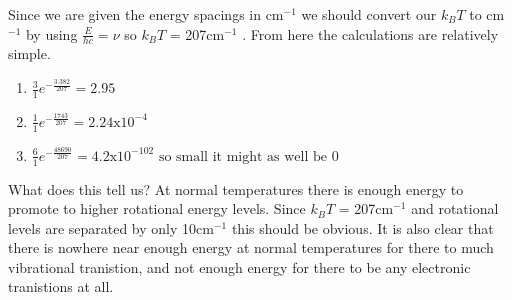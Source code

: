 \documentclass{article}
\newcommand{\cm}{cm\(^{-1}\) }
\begin{document}
    Since we are given the energy spacings in cm\(^{-1}\) we should convert our $k_BT$ to cm$^{-1}$ by using
    \(\frac{E}{hc} = \nu\) so $k_BT$ = 207\cm. From here the calculations are relatively simple.
    \begin{enumerate}
        \item \(\frac{3}{1}e^{-\frac{3.382}{207}} = 2.95\)
        \item \(\frac{1}{1}e^{-\frac{1743}{207}} = 2.24\text{x}10^{-4}\)
        \item \(\frac{6}{1}e^{-\frac{48690}{207}} = 4.2\text{x}10^{-102} \text{ so small it might as well be 0}\)
    \end{enumerate}

    What does this tell us? At normal temperatures there is enough energy to promote to higher rotational 
    energy levels. Since $k_BT$ = 207\cm and rotational levels are separated by only 10\cm this should be obvious.
    It is also clear that there is nowhere near enough energy at normal temperatures for there to much vibrational
    tranistion, and not enough energy for there to be any electronic tranistions at all.
\end{document}
